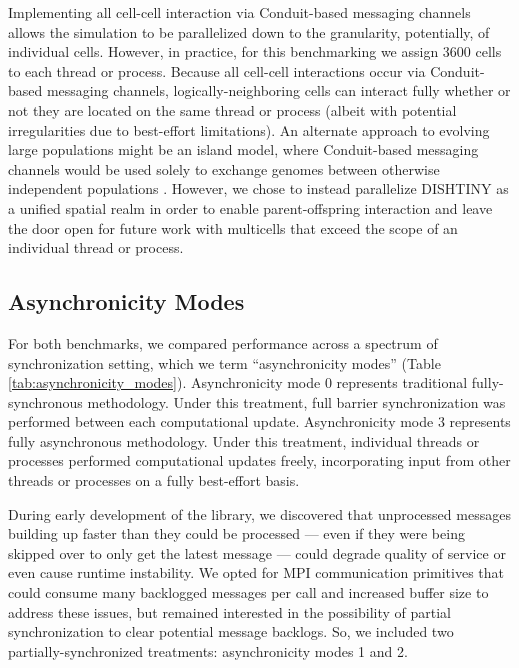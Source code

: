 Implementing all cell-cell interaction via Conduit-based messaging channels allows the simulation to be parallelized down to the granularity, potentially, of individual cells.
However, in practice, for this benchmarking we assign 3600 cells to each thread or process.
Because all cell-cell interactions occur via Conduit-based messaging channels, logically-neighboring cells can interact fully whether or not they are located on the same thread or process (albeit with potential irregularities due to best-effort limitations). 
An alternate approach to evolving large populations might be an island model, where Conduit-based messaging channels would be used solely to exchange genomes between otherwise independent populations \cite{bennett1999building}.
However, we chose to instead parallelize DISHTINY as a unified spatial realm in order to enable parent-offspring interaction and leave the door open for future work with multicells that exceed the scope of an individual thread or process.

\subsection{Asynchronicity Modes} \label{sec:asynchronicity_modes}



For both benchmarks, we compared performance across a spectrum of synchronization setting, which we term ``asynchronicity modes'' (Table \ref{tab:asynchronicity_modes}).
Asynchronicity mode 0 represents traditional fully-synchronous methodology.
Under this treatment, full barrier synchronization was performed between each computational update.
Asynchronicity mode 3 represents fully asynchronous methodology.
Under this treatment, individual threads or processes performed computational updates freely, incorporating input from other threads or processes on a fully best-effort basis.  

During early development of the library, we discovered that unprocessed messages building up faster than they could be processed --- even if they were being skipped over to only get the latest message --- could degrade quality of service or even cause runtime instability.
We opted for MPI communication primitives that could consume many backlogged messages per call and increased buffer size to address these issues, but remained interested in the possibility of partial synchronization to clear potential message backlogs.
So, we included two partially-synchronized treatments: asynchronicity modes 1 and 2.

